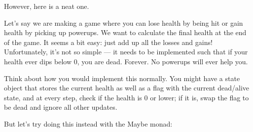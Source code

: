 \documentclass[]{article}
\begin{document}
However, here is a neat one.

Let's say we are making a game where you can lose health by being hit or gain
health by picking up powerups. We want to calculate the final health at the end
of the game. It seems a bit easy: just add up all the losses and gains!
Unfortunately, it's not so simple --- it needs to be implemented such that if
your health ever dips below 0, you are dead. Forever. No powerups will ever help
you.

Think about how you would implement this normally. You might have a state object
that stores the current health as well as a flag with the current dead/alive
state, and at every step, check if the health is 0 or lower; if it is, swap the
flag to be dead and ignore all other updates.

But let's try doing this instead with the Maybe monad:
\end{document}
